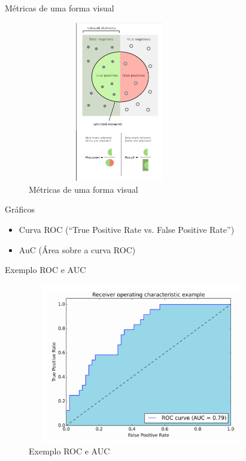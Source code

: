 \begin{frame}	
	\begin{block}{Métricas de uma forma visual}	
		\begin{figure}[!htb]
			\centering	  				
			\includegraphics[height=7cm, width = 8cm]{./pic/OverviewMetricas.png}
			\caption{Métricas de uma forma visual}
			\label{fig_metricas_visual}
		\end{figure}
	\end{block}
\end{frame}


\begin{frame}	
	\begin{block}{Gráficos}	
		\begin{itemize}
			\item Curva ROC (``True Positive Rate vs. False Positive Rate'')
			\item AuC (Área sobre a curva ROC)
		\end{itemize}		
	\end{block}
\end{frame}


\begin{frame}	
	\begin{block}{Exemplo ROC e AUC}	
		\begin{figure}[!htb]
			\centering	  				
			\includegraphics[height=7cm, width = 10cm]{./pic/Auc.png}
			\caption{Exemplo ROC e AUC}
			\label{fig_roc_auc}
		\end{figure}
	\end{block}
\end{frame}

